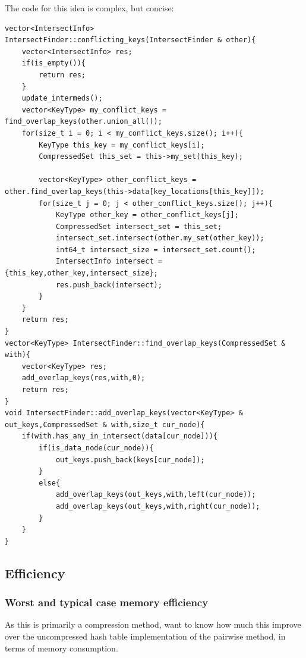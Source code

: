 \documentclass[12pt,twoside]{reedthesis}
\begin{document}
	The code for this idea is complex, but concise:
\begin{lstlisting}
vector<IntersectInfo>  IntersectFinder::conflicting_keys(IntersectFinder & other){
    vector<IntersectInfo> res;
    if(is_empty()){
        return res;
    }
    update_intermeds();
    vector<KeyType> my_conflict_keys = find_overlap_keys(other.union_all());
    for(size_t i = 0; i < my_conflict_keys.size(); i++){
        KeyType this_key = my_conflict_keys[i];
        CompressedSet this_set = this->my_set(this_key);
        
        vector<KeyType> other_conflict_keys = other.find_overlap_keys(this->data[key_locations[this_key]]);
        for(size_t j = 0; j < other_conflict_keys.size(); j++){
            KeyType other_key = other_conflict_keys[j];
            CompressedSet intersect_set = this_set;
            intersect_set.intersect(other.my_set(other_key));
            int64_t intersect_size = intersect_set.count();
            IntersectInfo intersect = {this_key,other_key,intersect_size};
            res.push_back(intersect);
        }
    }
    return res;
}
vector<KeyType> IntersectFinder::find_overlap_keys(CompressedSet & with){
    vector<KeyType> res;
    add_overlap_keys(res,with,0);
    return res;
}
void IntersectFinder::add_overlap_keys(vector<KeyType> & out_keys,CompressedSet & with,size_t cur_node){
    if(with.has_any_in_intersect(data[cur_node])){
        if(is_data_node(cur_node)){
            out_keys.push_back(keys[cur_node]);
        }
        else{
            add_overlap_keys(out_keys,with,left(cur_node));
            add_overlap_keys(out_keys,with,right(cur_node));
        }
    }
}
\end{lstlisting}

		\subsection{Efficiency}
		
		
		\subsubsection{Worst and typical case memory efficiency}
		As this is primarily a compression method, want to know how much this improve over the uncompressed hash table implementation of the pairwise method, in terms of memory consumption. 
		
\end{document}
